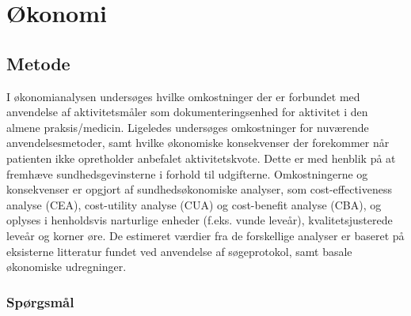 \chapter{Økonomi}

\section{Metode}

I økonomianalysen undersøges hvilke omkostninger der er forbundet med anvendelse af aktivitetsmåler som dokumenteringsenhed for aktivitet i den almene praksis/medicin.
Ligeledes undersøges omkostninger for nuværende anvendelsesmetoder, samt hvilke økonomiske konsekvenser der forekommer når patienten ikke opretholder anbefalet aktivitetskvote.
Dette er med henblik på at fremhæve sundhedsgevinsterne i forhold til udgifterne.   
Omkostningerne og konsekvenser er opgjort af sundhedsøkonomiske analyser, som cost-effectiveness analyse (CEA), cost-utility analyse (CUA) og cost-benefit analyse (CBA), og oplyses i henholdsvis narturlige enheder (f.eks. vunde leveår), kvalitetsjusterede leveår og korner øre. 
De estimeret værdier fra de forskellige analyser er baseret på eksisterne litteratur fundet ved anvendelse af søgeprotokol, samt basale økonomiske udregninger.    

\subsection{Spørgsmål}


